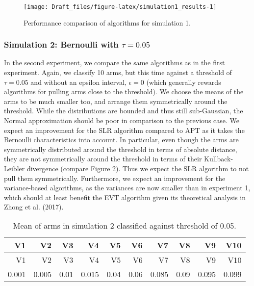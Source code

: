 \documentclass[11pt,]{article}
\begin{document}
\begin{figure}

{\centering \texttt{[image: Draft\_files/figure-latex/simulation1\_results-1]} 

}

\caption{Performance comparison of algorithms for simulation 1.}\label{fig:simulation1_results}
\end{figure}

\subsubsection{\texorpdfstring{Simulation 2: Bernoulli with
\(\tau = 0.05\)}{Simulation 2: Bernoulli with \textbackslash{}tau = 0.05}}\label{simulation-2-bernoulli-with-tau-0.05}

In the second experiment, we compare the same algorithms as in the first
experiment. Again, we classify 10 arms, but this time against a
threshold of \(\tau = 0.05\) and without an epsilon interval,
\(\epsilon = 0\) (which generally rewards algorithms for pulling arms
close to the threshold). We choose the means of the arms to be much
smaller too, and arrange them symmetrically around the threshold. While
the distributions are bounded and thus still sub-Gaussian, the Normal
approximation should be poor in comparison to the previous case. We
expect an improvement for the SLR algorithm compared to APT as it takes
the Bernoulli characteristics into account. In particular, even though
the arms are symmetrically distributed around the threshold in terms of
absolute distance, they are not symmetrically around the threshold in
terms of their Kullback-Leibler divergence (compare Figure 2). Thus we
expect the SLR algorithm to not pull them symmetrically. Furthermore, we
expect an improvement for the variance-based algorithms, as the
variances are now smaller than in experiment 1, which should at least
benefit the EVT algorithm given its theoretical analysis in Zhong et al.
(2017).

\begin{longtable}[]{@{}rrrrrrrrrr@{}}
\caption{Mean of arms in simulation 2 classified against threshold of
0.05.}\tabularnewline
\toprule
V1 & V2 & V3 & V4 & V5 & V6 & V7 & V8 & V9 & V10\tabularnewline
\midrule
\endfirsthead
\toprule
V1 & V2 & V3 & V4 & V5 & V6 & V7 & V8 & V9 & V10\tabularnewline
\midrule
\endhead
0.001 & 0.005 & 0.01 & 0.015 & 0.04 & 0.06 & 0.085 & 0.09 & 0.095 &
0.099\tabularnewline
\bottomrule
\end{longtable}
\end{document}
